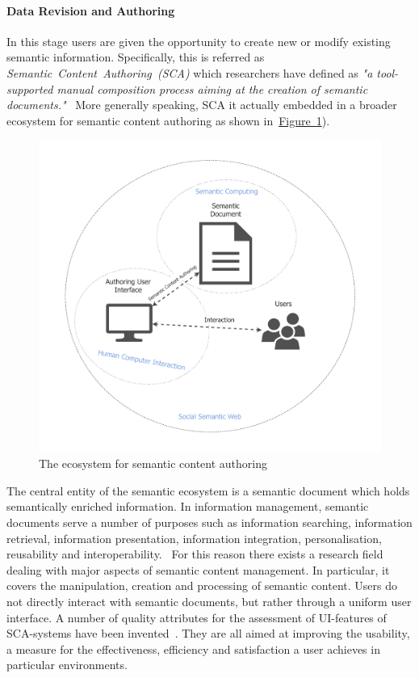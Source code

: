 \paragraph{Data Revision and Authoring} In this stage users are given the opportunity to create new or modify existing semantic information. 
Specifically, this is referred as \textit{Semantic~Content~Authoring~(SCA)} which researchers have defined as \textit{"a tool-supported
manual composition process aiming at the creation of semantic documents."}~\cite{khalili2013} More generally speaking, SCA it actually embedded in a broader ecosystem for semantic content authoring as shown in~\hyperref[fig:authoring_semantic_ecosystem]{Figure~\ref*{fig:authoring_semantic_ecosystem}}). 
\begin{figure}
	 \centering
	 \includegraphics[width=1\textwidth]{drawio/authoring_semantic_ecosystem}
	 \caption{The ecosystem for semantic content authoring}\label{fig:authoring_semantic_ecosystem}
\end{figure}
The central entity of the semantic ecosystem is a semantic document which holds semantically enriched information. 
In information management, semantic documents serve a number of purposes such as information searching, information retrieval, information presentation, information integration, personalisation, reusability and interoperability.~\cite{khalili2013} For this reason there exists a research field dealing with major aspects of semantic content management. In particular, it covers the manipulation, creation and processing of semantic content. Users do not directly interact with semantic documents, but rather through a uniform user interface. A number of quality attributes for the assessment of UI-features of SCA-systems have been invented~\cite{khalili2013}. They are all aimed at improving the usability, a measure for the effectiveness, efficiency and satisfaction a user achieves in particular environments. 

